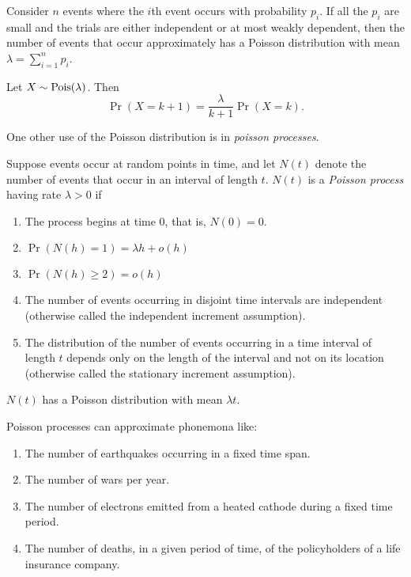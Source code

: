 \documentclass{article}
\begin{document}
\begin{theorem}
  Consider $n$ events where the $i$th event occurs with probability $p_i$.
  If all the $p_i$ are small and the trials are either independent or at most weakly dependent, then the number of events that occur approximately has a Poisson distribution with mean $\lambda = \sum_{i = 1}^n p_i$.
\end{theorem}

\begin{proposition}[Relationship between $\Pr(X = k + 1)$ and $\Pr(X = k)$]
  Let $X \sim \textnormal{Pois}(\lambda)$.
  Then
  \[
    \Pr(X = k + 1) = \frac{\lambda}{k + 1} \Pr(X = k).
  \]
\end{proposition}

One other use of the Poisson distribution is in \emph{poisson processes}.

\begin{theorem}
  Suppose events occur at random points in time, and let $N(t)$ denote the number of events that occur in an interval of length $t$.
  $N(t)$ is a \emph{Poisson process} having rate $\lambda > 0$ if
  \begin{enumerate}
    \item The process begins at time $0$, that is, $N(0) = 0$.
    \item $\Pr(N(h) = 1) = \lambda h + o(h)$
    \item $\Pr(N(h) \geq 2) = o(h)$
    \item The number of events occurring in disjoint time intervals are independent (otherwise called the independent increment assumption).
    \item The distribution of the number of events occurring in a time interval of length $t$ depends only on the length of the interval and not on its location (otherwise called the stationary increment assumption).
  \end{enumerate}
  $N(t)$ has a Poisson distribution with mean $\lambda t$.
\end{theorem}

\begin{example}
  Poisson processes can approximate phonemona like:
  \begin{enumerate}
    \item The number of earthquakes occurring in a fixed time span.
    \item The number of wars per year.
    \item The number of electrons emitted from a heated cathode during a fixed time period.
    \item The number of deaths, in a given period of time, of the policyholders of a life insurance company.
  \end{enumerate}
\end{example}
\end{document}
